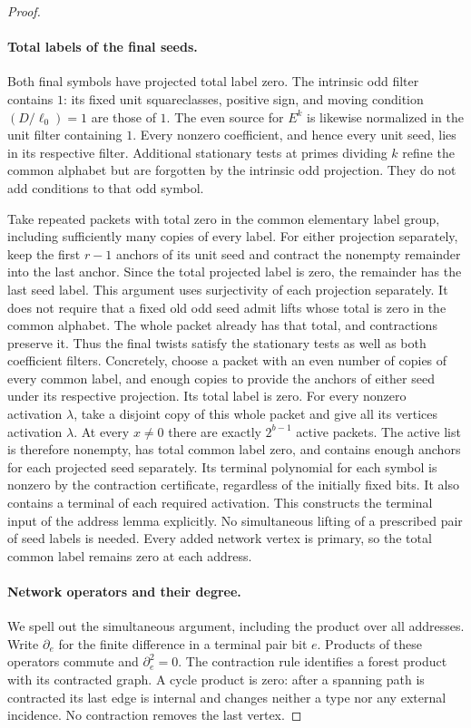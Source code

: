 \begin{proof}\leavevmode
\paragraph{Total labels of the final seeds.}
Both final symbols have projected total label zero. The intrinsic
odd filter contains $1$: its fixed unit squareclasses, positive sign,
and moving condition $(D/\ell_0)=1$ are those of $1$. The even source
for $E^k$ is likewise normalized in the unit filter containing $1$.
Every nonzero coefficient, and hence every unit seed, lies in its
respective filter. Additional stationary tests at primes dividing
$k$ refine the common alphabet but are forgotten by the intrinsic
odd projection. They do not add conditions to that odd symbol.

Take repeated packets with total zero in the common elementary
label group, including sufficiently many copies of every label.
For either projection separately, keep the first $r-1$ anchors of
its unit seed and contract the nonempty remainder into the last
anchor. Since the total projected label is zero, the remainder has
the last seed label. This argument uses surjectivity of each
projection separately. It does not require that a fixed old odd
seed admit lifts whose total is zero in the common alphabet.
The whole packet already has that total, and contractions preserve
it. Thus the final twists satisfy the stationary tests as well as
both coefficient filters.
Concretely, choose a packet with an even number of copies of every
common label, and enough copies to provide the anchors of either
seed under its respective projection.  Its total label is zero.
For every nonzero activation $\lambda$, take a disjoint copy of
this whole packet and give all its vertices activation $\lambda$.
At every $x\ne0$ there are exactly $2^{b-1}$ active packets.
The active list is therefore nonempty, has total common label zero,
and contains enough anchors for each projected seed separately.
Its terminal polynomial for each symbol is nonzero by the
contraction certificate, regardless of the initially fixed bits.
It also contains a terminal of each required activation.  This
constructs the terminal input of the address lemma explicitly.
No simultaneous lifting of a prescribed pair of seed labels is
needed.  Every added network vertex is primary, so the total
common label remains zero at each address.

\paragraph{Network operators and their degree.}
We spell out the simultaneous argument, including the product over
all addresses.  Write $\partial_e$ for the finite difference in a
terminal pair bit $e$.  Products of these operators commute and
$\partial_e^2=0$.  The contraction rule identifies a forest product
with its contracted graph.  A cycle product is zero: after a
spanning path is contracted its last edge is internal and changes
neither a type nor any external incidence.  No contraction removes
the last vertex.


\end{proof}
